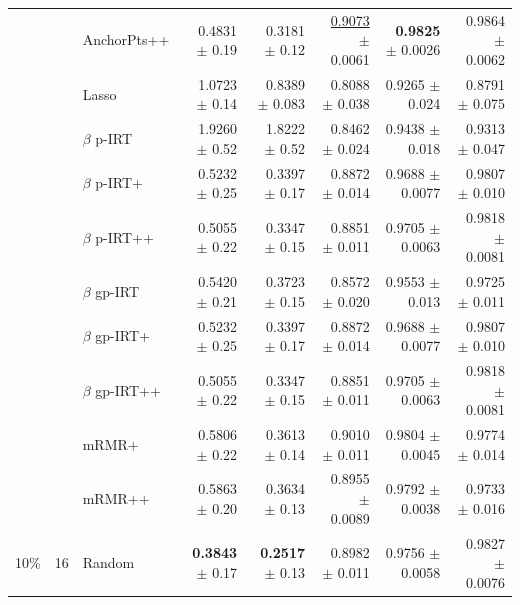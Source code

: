 \begin{longtable}{llp{}rrrrr}
 &  & AnchorPts++ & 0.4831 {\scriptsize $\pm$ 0.19} & 0.3181 {\scriptsize $\pm$ 0.12} & \underline{0.9073} {\scriptsize $\pm$ 0.0061} & \textbf{0.9825} {\scriptsize $\pm$ 0.0026} & 0.9864 {\scriptsize $\pm$ 0.0062} \\
 &  & Lasso & 1.0723 {\scriptsize $\pm$ 0.14} & 0.8389 {\scriptsize $\pm$ 0.083} & 0.8088 {\scriptsize $\pm$ 0.038} & 0.9265 {\scriptsize $\pm$ 0.024} & 0.8791 {\scriptsize $\pm$ 0.075} \\
 &  & $\beta$ p-IRT & 1.9260 {\scriptsize $\pm$ 0.52} & 1.8222 {\scriptsize $\pm$ 0.52} & 0.8462 {\scriptsize $\pm$ 0.024} & 0.9438 {\scriptsize $\pm$ 0.018} & 0.9313 {\scriptsize $\pm$ 0.047} \\
 &  & $\beta$ p-IRT+ & 0.5232 {\scriptsize $\pm$ 0.25} & 0.3397 {\scriptsize $\pm$ 0.17} & 0.8872 {\scriptsize $\pm$ 0.014} & 0.9688 {\scriptsize $\pm$ 0.0077} & 0.9807 {\scriptsize $\pm$ 0.010} \\
 &  & $\beta$ p-IRT++ & 0.5055 {\scriptsize $\pm$ 0.22} & 0.3347 {\scriptsize $\pm$ 0.15} & 0.8851 {\scriptsize $\pm$ 0.011} & 0.9705 {\scriptsize $\pm$ 0.0063} & 0.9818 {\scriptsize $\pm$ 0.0081} \\
 &  & $\beta$ gp-IRT & 0.5420 {\scriptsize $\pm$ 0.21} & 0.3723 {\scriptsize $\pm$ 0.15} & 0.8572 {\scriptsize $\pm$ 0.020} & 0.9553 {\scriptsize $\pm$ 0.013} & 0.9725 {\scriptsize $\pm$ 0.011} \\
 &  & $\beta$ gp-IRT+ & 0.5232 {\scriptsize $\pm$ 0.25} & 0.3397 {\scriptsize $\pm$ 0.17} & 0.8872 {\scriptsize $\pm$ 0.014} & 0.9688 {\scriptsize $\pm$ 0.0077} & 0.9807 {\scriptsize $\pm$ 0.010} \\
 &  & $\beta$ gp-IRT++ & 0.5055 {\scriptsize $\pm$ 0.22} & 0.3347 {\scriptsize $\pm$ 0.15} & 0.8851 {\scriptsize $\pm$ 0.011} & 0.9705 {\scriptsize $\pm$ 0.0063} & 0.9818 {\scriptsize $\pm$ 0.0081} \\
 &  & mRMR+ & 0.5806 {\scriptsize $\pm$ 0.22} & 0.3613 {\scriptsize $\pm$ 0.14} & 0.9010 {\scriptsize $\pm$ 0.011} & 0.9804 {\scriptsize $\pm$ 0.0045} & 0.9774 {\scriptsize $\pm$ 0.014} \\
 &  & mRMR++ & 0.5863 {\scriptsize $\pm$ 0.20} & 0.3634 {\scriptsize $\pm$ 0.13} & 0.8955 {\scriptsize $\pm$ 0.0089} & 0.9792 {\scriptsize $\pm$ 0.0038} & 0.9733 {\scriptsize $\pm$ 0.016} \\
\midrule
10\% & 16 & Random & \textbf{0.3843} {\scriptsize $\pm$ 0.17} & \textbf{0.2517} {\scriptsize $\pm$ 0.13} & 0.8982 {\scriptsize $\pm$ 0.011} & 0.9756 {\scriptsize $\pm$ 0.0058} & 0.9827 {\scriptsize $\pm$ 0.0076} \\

\end{longtable}
